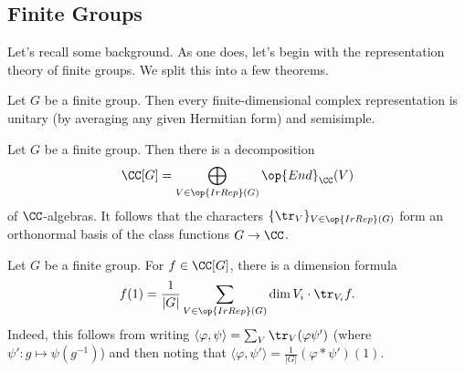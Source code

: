 \documentclass[../notes.tex]{subfiles}
\begin{document}
\subsection{Finite Groups}
Let's recall some background. As one does, let's begin with the representation theory of finite groups. We split this into a few theorems.
\begin{theorem}[Maschke]
	Let $G$ be a finite group. Then every finite-dimensional complex representation is unitary (by averaging any given Hermitian form) and semisimple.
\end{theorem}
\begin{theorem}
	Let $G$ be a finite group. Then there is a decomposition
	\[\CC[G]=\bigoplus_{V\in\op{IrRep}(G)}\op{End}_\CC(V)\]
	of $\CC$-algebras. It follows that the characters $\{{\tr_V}\}_{V\in\op{IrRep}(G)}$ form an orthonormal basis of the class functions $G\to\CC$.
\end{theorem}
\begin{remark}
	Let $G$ be a finite group. For $f\in\CC[G]$, there is a dimension formula
	\[f(1)=\frac1{\left|G\right|}\sum_{V\in\op{IrRep}(G)}\dim V_i\cdot\tr_{V_i}f.\]
	Indeed, this follows from writing $\langle\varphi,\psi\rangle=\sum_V\tr_V(\varphi\psi')$ (where $\psi'\colon g\mapsto\psi(g^{-1})$) and then noting that $\langle\varphi,\psi'\rangle=\frac1{\left|G\right|}(\varphi*\psi')(1)$.
\end{remark}
\end{document}
